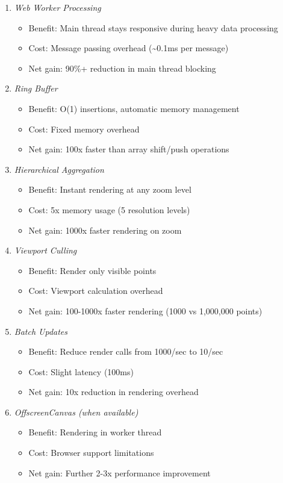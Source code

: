 \documentclass[11pt]{article}
\begin{document}
\begin{enumerate}
\item \emph{Web Worker Processing}
\begin{itemize}
\item Benefit: Main thread stays responsive during heavy data processing
\item Cost: Message passing overhead (\textasciitilde{}0.1ms per message)
\item Net gain: 90\%+ reduction in main thread blocking
\end{itemize}

\item \emph{Ring Buffer}
\begin{itemize}
\item Benefit: O(1) insertions, automatic memory management
\item Cost: Fixed memory overhead
\item Net gain: 100x faster than array shift/push operations
\end{itemize}

\item \emph{Hierarchical Aggregation}
\begin{itemize}
\item Benefit: Instant rendering at any zoom level
\item Cost: 5x memory usage (5 resolution levels)
\item Net gain: 1000x faster rendering on zoom
\end{itemize}

\item \emph{Viewport Culling}
\begin{itemize}
\item Benefit: Render only visible points
\item Cost: Viewport calculation overhead
\item Net gain: 100-1000x faster rendering (1000 vs 1,000,000 points)
\end{itemize}

\item \emph{Batch Updates}
\begin{itemize}
\item Benefit: Reduce render calls from 1000/sec to 10/sec
\item Cost: Slight latency (100ms)
\item Net gain: 10x reduction in rendering overhead
\end{itemize}

\item \emph{OffscreenCanvas (when available)}
\begin{itemize}
\item Benefit: Rendering in worker thread
\item Cost: Browser support limitations
\item Net gain: Further 2-3x performance improvement
\end{itemize}
\end{enumerate}
\end{document}

